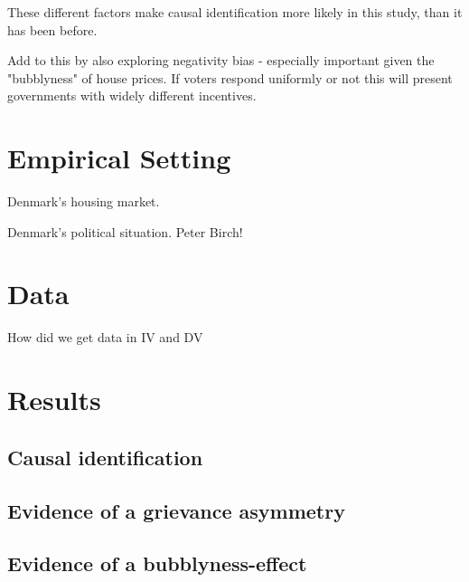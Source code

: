 \documentclass[12pt,a4paper]{article}
\begin{document}
These different factors make causal identification more likely in this study, than it has been before. 

Add to this by also exploring negativity bias - especially important given the "bubblyness" of house prices. If voters respond uniformly or not this will present governments with widely different incentives. 



\section{Empirical Setting}

Denmark's housing market.

Denmark's political situation.
Peter Birch!


\section{Data}

How did we get data in IV and DV

\section{Results}



\subsection{Causal identification}





\subsection{Evidence of a grievance asymmetry}



\subsection{Evidence of a  bubblyness-effect}


\end{document}
